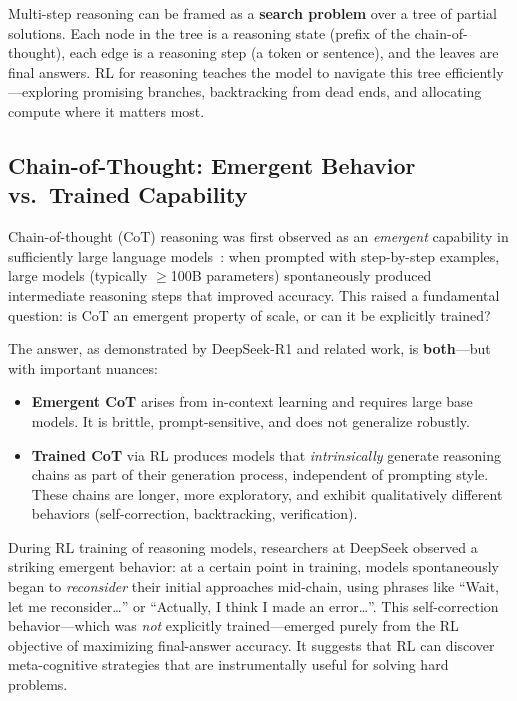 \begin{keybox}
Multi-step reasoning can be framed as a \textbf{search problem} over a tree of partial solutions. Each node in the tree is a reasoning state (prefix of the chain-of-thought), each edge is a reasoning step (a token or sentence), and the leaves are final answers. RL for reasoning teaches the model to navigate this tree efficiently---exploring promising branches, backtracking from dead ends, and allocating compute where it matters most.
\end{keybox}

\subsection{Chain-of-Thought: Emergent Behavior vs.~Trained Capability}
\label{chain-of-thought-emergent-behavior-vs.-trained-capability}

Chain-of-thought (CoT) reasoning was first observed as an \emph{emergent} capability in sufficiently large language models~\cite{wei2022chain}: when prompted with step-by-step examples, large models (typically $\geq$100B parameters) spontaneously produced intermediate reasoning steps that improved accuracy. This raised a fundamental question: is CoT an emergent property of scale, or can it be explicitly trained?

The answer, as demonstrated by DeepSeek-R1 and related work, is \textbf{both}---but with important nuances:

\begin{itemize}
  \item \textbf{Emergent CoT} arises from in-context learning and requires large base models. It is brittle, prompt-sensitive, and does not generalize robustly.
  \item \textbf{Trained CoT} via RL produces models that \emph{intrinsically} generate reasoning chains as part of their generation process, independent of prompting style. These chains are longer, more exploratory, and exhibit qualitatively different behaviors (self-correction, backtracking, verification).
\end{itemize}

\begin{intuitionbox}
During RL training of reasoning models, researchers at DeepSeek observed a striking emergent behavior: at a certain point in training, models spontaneously began to \emph{reconsider} their initial approaches mid-chain, using phrases like ``Wait, let me reconsider\ldots{}'' or ``Actually, I think I made an error\ldots{}''. This self-correction behavior---which was \emph{not} explicitly trained---emerged purely from the RL objective of maximizing final-answer accuracy. It suggests that RL can discover meta-cognitive strategies that are instrumentally useful for solving hard problems.
\end{intuitionbox}

